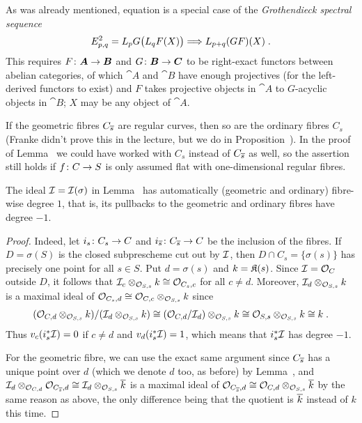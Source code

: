 \documentclass[a4paper,parskip=half,numbers=enddot, DIV=12]{scrreprt}
\begin{document}
\begin{rem}
	As was already mentioned, equation  is a special case of the \emph{Grothendieck spectral sequence}
	\begin{align*}
		E_{p,q}^2=L_pG\big(L_qF(X)\big)\converge L_{p+q}(GF)(X)\;.
	\end{align*}
	This requires $F\colon \cat A\morphism \cat B$ and $G\colon \cat B\morphism\cat C$ to be right-exact functors between abelian categories, of which $\cat A$ and $\cat B$ have enough projectives (for the left-derived functors to exist) and $F$ takes projective objects in $\cat A$ to $G$-acyclic objects in $\cat B$; $X$ may be any object of $\cat A$.
\end{rem}
\begin{rem}
	If the geometric fibres $C_{\overline{s}}$ are regular curves, then so are the ordinary fibres $C_s$ (Franke didn't prove this in the lecture, but we do in Proposition~). In the proof of Lemma~ we could have worked with $C_s$ instead of $C_{\overline{s}}$ as well, so the assertion still holds if $f\colon C\morphism S$ is only assumed flat with one-dimensional regular fibres.
\end{rem}
\begin{lem}
	The ideal $\mathcal{I}=\mathcal{I}(\sigma)$ in Lemma~ has automatically (geometric and ordinary) fibre-wise degree $1$, that is, its pullbacks to the geometric and ordinary fibres have degree $-1$.
\end{lem}
\begin{proof}
	Indeed, let $i_s\colon C_s\morphism C$ and $i_{\ov{s}}\colon C_{\ov{s}}\morphism C$ be the inclusion of the fibres. If $D=\sigma(S)$ is the closed subprescheme cut out by $\mathcal{I}$, then $D\cap C_s=\{\sigma(s)\}$ has precisely one point for all $s\in S$. Put $d=\sigma(s)$ and $k=\mathfrak{K}(s)$. Since $\mathcal{I}=\mathcal{O}_C$ outside $D$, it follows that $\mathcal{I}_c\otimes_{\mathcal{O}_{S,s}}k\cong \mathcal{O}_{C_s,c}$ for all $c\neq d$. Moreover, $\mathcal{I}_d\otimes_{\mathcal{O}_{S,s}}k$ is a maximal ideal of $\mathcal{O}_{C_s,d}\cong \mathcal{O}_{C,c}\otimes_{\mathcal{O}_{S,s}}k$ since
	\begin{align*}
		(\mathcal{O}_{C,d}\otimes_{\mathcal{O}_{S,s}}k)/(\mathcal{I}_d\otimes_{\mathcal{O}_{S,s}}k)\cong (\mathcal{O}_{C,d}/\mathcal{I}_d)\otimes_{\mathcal{O}_{S,s}}k\cong \mathcal{O}_{S,s}\otimes_{\mathcal{O}_{S,s}}k\cong k\;.
	\end{align*}
	Thus $v_c(i_s^*\mathcal{I})=0$ if $c\neq d$ and $v_d(i_s^*\mathcal{I})=1$, which means that $i_s^*\mathcal{I}$ has degree $-1$.
	
	For the geometric fibre, we can use the exact same argument since $C_{\overline{s}}$ has a unique point over $d$ (which we denote $d$ too, as before) by Lemma~, and $\mathcal{I}_d\otimes_{\mathcal{O}_{C,d}}\mathcal{O}_{C_{\overline{s}},d}\cong \mathcal{I}_d\otimes_{\mathcal{O}_{S,s}}\overline{k}$ is a maximal ideal of $\mathcal{O}_{C_{\overline{s}},d}\cong \mathcal{O}_{C,d}\otimes_{\mathcal{O}_{S,s}}\overline{k}$ by the same reason as above, the only difference being that the quotient is $\overline{k}$ instead of $k$ this time.
\end{proof}
\end{document}
